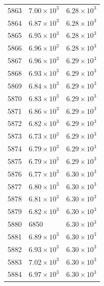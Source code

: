 \begin{table}[H]
\begin{tabular}{lll}
5863 & $\displaystyle 7.00 \times 10^{3}$ & $\displaystyle 6.28 \times 10^{3}$ \\
5864 & $\displaystyle 6.87 \times 10^{3}$ & $\displaystyle 6.28 \times 10^{3}$ \\
5865 & $\displaystyle 6.95 \times 10^{3}$ & $\displaystyle 6.28 \times 10^{3}$ \\
5866 & $\displaystyle 6.96 \times 10^{3}$ & $\displaystyle 6.28 \times 10^{3}$ \\
5867 & $\displaystyle 6.96 \times 10^{3}$ & $\displaystyle 6.29 \times 10^{3}$ \\
5868 & $\displaystyle 6.93 \times 10^{3}$ & $\displaystyle 6.29 \times 10^{3}$ \\
5869 & $\displaystyle 6.84 \times 10^{3}$ & $\displaystyle 6.29 \times 10^{3}$ \\
5870 & $\displaystyle 6.83 \times 10^{3}$ & $\displaystyle 6.29 \times 10^{3}$ \\
5871 & $\displaystyle 6.86 \times 10^{3}$ & $\displaystyle 6.29 \times 10^{3}$ \\
5872 & $\displaystyle 6.82 \times 10^{3}$ & $\displaystyle 6.29 \times 10^{3}$ \\
5873 & $\displaystyle 6.73 \times 10^{3}$ & $\displaystyle 6.29 \times 10^{3}$ \\
5874 & $\displaystyle 6.79 \times 10^{3}$ & $\displaystyle 6.29 \times 10^{3}$ \\
5875 & $\displaystyle 6.79 \times 10^{3}$ & $\displaystyle 6.29 \times 10^{3}$ \\
5876 & $\displaystyle 6.77 \times 10^{3}$ & $\displaystyle 6.30 \times 10^{3}$ \\
5877 & $\displaystyle 6.80 \times 10^{3}$ & $\displaystyle 6.30 \times 10^{3}$ \\
5878 & $\displaystyle 6.81 \times 10^{3}$ & $\displaystyle 6.30 \times 10^{3}$ \\
5879 & $\displaystyle 6.82 \times 10^{3}$ & $\displaystyle 6.30 \times 10^{3}$ \\
5880 & 6850 & $\displaystyle 6.30 \times 10^{3}$ \\
5881 & $\displaystyle 6.89 \times 10^{3}$ & $\displaystyle 6.30 \times 10^{3}$ \\
5882 & $\displaystyle 6.93 \times 10^{3}$ & $\displaystyle 6.30 \times 10^{3}$ \\
5883 & $\displaystyle 7.02 \times 10^{3}$ & $\displaystyle 6.30 \times 10^{3}$ \\
5884 & $\displaystyle 6.97 \times 10^{3}$ & $\displaystyle 6.30 \times 10^{3}$ \\

\end{tabular}
\end{table}
